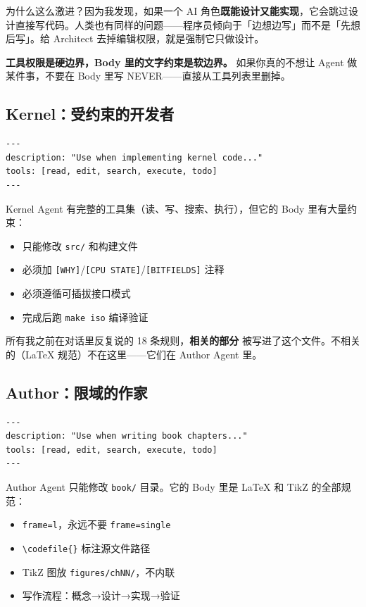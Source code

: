 为什么这么激进？因为我发现，如果一个 AI 角色\textbf{既能设计又能实现}，它会跳过设计直接写代码。人类也有同样的问题——程序员倾向于「边想边写」而不是「先想后写」。给 Architect 去掉编辑权限，就是强制它只做设计。

\begin{designbox}
\textbf{工具权限是硬边界，Body 里的文字约束是软边界。} 如果你真的不想让 Agent 做某件事，不要在 Body 里写 NEVER——直接从工具列表里删掉。
\end{designbox}

\subsection{Kernel：受约束的开发者}

\begin{lstlisting}[style=yamlstyle]
---
description: "Use when implementing kernel code..."
tools: [read, edit, search, execute, todo]
---
\end{lstlisting}

Kernel Agent 有完整的工具集（读、写、搜索、执行），但它的 Body 里有大量约束：

\begin{itemize}
  \item 只能修改 \texttt{src/} 和构建文件
  \item 必须加 \texttt{[WHY]}/\texttt{[CPU STATE]}/\texttt{[BITFIELDS]} 注释
  \item 必须遵循可插拔接口模式
  \item 完成后跑 \texttt{make iso} 编译验证
\end{itemize}

所有我之前在对话里反复说的 18 条规则，\textbf{相关的部分} 被写进了这个文件。不相关的（LaTeX 规范）不在这里——它们在 Author Agent 里。

\subsection{Author：限域的作家}

\begin{lstlisting}[style=yamlstyle]
---
description: "Use when writing book chapters..."
tools: [read, edit, search, execute, todo]
---
\end{lstlisting}

Author Agent 只能修改 \texttt{book/} 目录。它的 Body 里是 LaTeX 和 TikZ 的全部规范：

\begin{itemize}
  \item \texttt{frame=l}，永远不要 \texttt{frame=single}
  \item \texttt{\textbackslash codefile\{\}} 标注源文件路径
  \item TikZ 图放 \texttt{figures/chNN/}，不内联
  \item 写作流程：概念→设计→实现→验证
\end{itemize}

